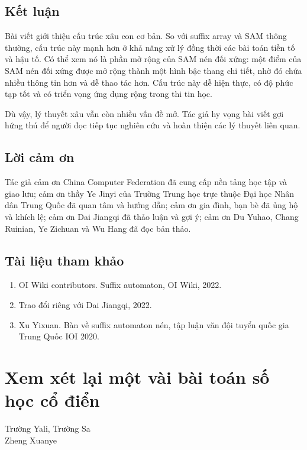 \documentclass[11pt]{article}
\begin{document}
\subsection{Kết luận}

Bài viết giới thiệu cấu trúc xâu con cơ bản. So với suffix array và SAM thông
thường, cấu trúc này mạnh hơn ở khả năng xử lý đồng thời các bài toán tiền tố
và hậu tố. Có thể xem nó là phần mở rộng của SAM nén đối xứng: một điểm của
SAM nén đối xứng được mở rộng thành một hình bậc thang chi tiết, nhờ đó chứa
nhiều thông tin hơn và dễ thao tác hơn. Cấu trúc này dễ hiện thực, có độ phức
tạp tốt và có triển vọng ứng dụng rộng trong thi tin học.

Dù vậy, lý thuyết xâu vẫn còn nhiều vấn đề mở. Tác giả hy vọng bài viết gợi
hứng thú để người đọc tiếp tục nghiên cứu và hoàn thiện các lý thuyết liên
quan.

\subsection{Lời cảm ơn}

Tác giả cảm ơn China Computer Federation đã cung cấp nền tảng học tập và giao
lưu; cảm ơn thầy Ye Jinyi của Trường Trung học trực thuộc Đại học Nhân dân
Trung Quốc đã quan tâm và hướng dẫn; cảm ơn gia đình, bạn bè đã ủng hộ và
khích lệ; cảm ơn Dai Jiangqi đã thảo luận và gợi ý; cảm ơn Du Yuhao, Chang
Ruinian, Ye Zichuan và Wu Hang đã đọc bản thảo.

\subsection{Tài liệu tham khảo}

\begin{enumerate}
  \item OI Wiki contributors. Suffix automaton, OI Wiki, 2022.
  \item Trao đổi riêng với Dai Jiangqi, 2022.
  \item Xu Yixuan. Bàn về suffix automaton nén, tập luận văn đội tuyển quốc gia
  Trung Quốc IOI 2020.
\end{enumerate}

\section{Xem xét lại một vài bài toán số học cổ điển}

\begin{center}
Trường Yali, Trường Sa\\
Zheng Xuanye
\end{center}
\end{document}
